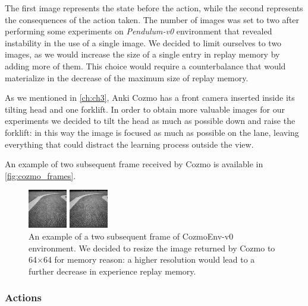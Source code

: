 The first image represents the state before the action, while the second represents the consequences of the action taken.
The number of images was set to two after performing some experiments on \textit{Pendulum-v0} environment that revealed instability in the use of a single image.
We decided to limit ourselves to two images, as we would increase the size of a single entry in replay memory by adding more of them.
This choice would require a counterbalance that would materialize in the decrease of the maximum size of replay memory.

As we mentioned in \vref{ch:ch3}, Anki Cozmo has a front camera inserted inside its tilting head and one forklift.
In order to obtain more valuable images for our experiments we decided to tilt the head as much as possible down and raise the forklift: in this way the image is focused as much as possible on the lane, leaving everything that could distract the learning process outside the view.

An example of two subsequent frame received by Cozmo is available in \vref{fig:cozmo_frames}.
\begin{figure}

	\begin{minipage}[t]{0.5\linewidth}
		\centering
		\includegraphics[height=0.25\paperwidth]{img/cozmo_frame_1.jpg}
	\end{minipage}
	\begin{minipage}[t]{0.5\linewidth}
		\centering
		\includegraphics[height=0.25\paperwidth]{img/cozmo_frame_2.jpg}
	\end{minipage}

	\caption[Example of two subsequent frame of CozmoEnv-v0]{An example of a two subsequent frame of CozmoEnv-v0 environment. We decided to resize the image returned by Cozmo to 64$\times$64 for memory reason: a higher resolution would lead to a further decrease in experience replay memory.}
	\label{fig:cozmo_frames}
\end{figure}

\subsubsection{Actions}

